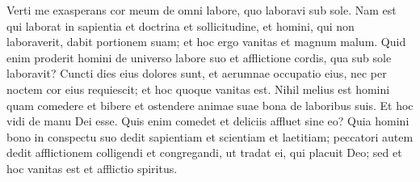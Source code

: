 \begin{biblechapter}
\verse Verti me exasperans cor meum de omni labore, quo laboravi sub sole.  
\verse Nam est qui laborat in sapientia et doctrina et sollicitudine, et homini, qui non laboraverit, dabit portionem suam; et hoc ergo vanitas et magnum malum. 
\verse Quid enim proderit homini de universo labore suo et afflictione cordis, qua sub sole laboravit? 
\verse Cuncti dies eius dolores sunt, et aerumnae occupatio eius, nec per noctem cor eius requiescit; et hoc quoque vanitas est. 
\verse Nihil melius est homini quam comedere et bibere et ostendere animae suae bona de laboribus suis. Et hoc vidi de manu Dei esse. 
\verse Quis enim comedet et deliciis affluet sine eo? 
\verse Quia homini bono in conspectu suo dedit sapientiam et scientiam et laetitiam; peccatori autem dedit afflictionem colligendi et congregandi, ut tradat ei, qui placuit Deo; sed et hoc vanitas est et afflictio spiritus. 
\end{biblechapter}


